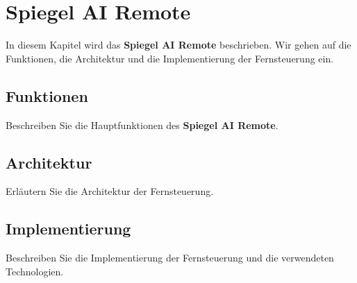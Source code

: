 \chapter{Spiegel AI Remote}

In diesem Kapitel wird das \textbf{Spiegel AI Remote} beschrieben. Wir gehen auf die Funktionen, die Architektur und die Implementierung der Fernsteuerung ein.

\section{Funktionen}
Beschreiben Sie die Hauptfunktionen des \textbf{Spiegel AI Remote}.

\section{Architektur}
Erläutern Sie die Architektur der Fernsteuerung.

\section{Implementierung}
Beschreiben Sie die Implementierung der Fernsteuerung und die verwendeten Technologien.
